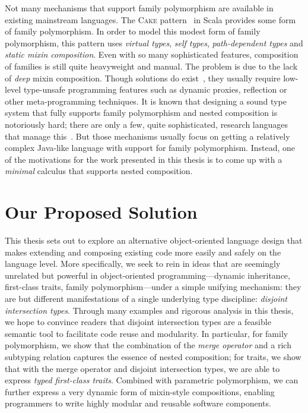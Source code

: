 Not many mechanisms that support family polymorphism are available in existing
mainstream languages. The \textsc{Cake} pattern~\citep{odersky2005scalable,
  Zenger-Odersky2005} in Scala provides some form of family polymorphism. In
order to model this modest form of family polymorphism, this pattern uses
\emph{virtual types}, \emph{self types}, \emph{path-dependent types} and
\emph{static mixin composition}. Even with so many sophisticated features,
composition of families is still quite heavyweight and manual. The problem is
due to the lack of \emph{deep} mixin composition. Though solutions do
exist~\citep{oliveira2013feature}, they usually require low-level type-unsafe
programming features such as dynamic proxies, reflection or other
meta-programming techniques. It is known that designing a sound type system that
fully supports family polymorphism and nested composition is notoriously hard;
there are only a few, quite sophisticated, research languages that manage
this~\citep{ErnstVirtual, Nystrom_2004, pubsdoc:tribe-virtual-calculus,SAITO_2007}.
But those mechanisms usually focus
on getting a relatively complex Java-like language with support for family polymorphism. Instead, one
of the motivations for the work presented in this thesis is to come up with a \textit{minimal} calculus that
supports nested composition.



\section{Our Proposed Solution}

This thesis sets out to explore an alternative object-oriented language design
that makes extending and composing existing code more easily and safely on the
language level. More specifically, we seek to rein in ideas that are seemingly
unrelated but powerful in object-oriented programming---dynamic inheritance,
first-class traits, family polymorphism---under a simple unifying mechanism:
they are but different manifestations of a single underlying type discipline:
\emph{disjoint intersection types}. Through many examples and rigorous
analysis in this thesis, we hope to convince readers that disjoint intersection
types are a feasible semantic tool to facilitate code reuse and modularity. In
particular, for family polymorphism, we show that the combination of the
\emph{merge operator} and a rich subtyping relation captures the essence of
nested composition; for traits, we show that with the merge operator and
disjoint intersection types, we are able to express \emph{typed first-class
  traits}. Combined with parametric polymorphism, we can further
express a very dynamic form of mixin-style compositions, enabling programmers to write highly
modular and reusable software components.

